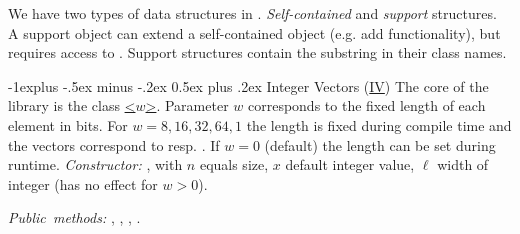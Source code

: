 \documentclass[10pt,landscape]{article}
\makeatletter
\renewcommand{\subsection}{\@startsection{subsection}{2}{0mm}%
                                {-1explus -.5ex minus -.2ex}%
                                {0.5ex plus .2ex}%
                                {\normalfont\normalsize\bfseries}}
\makeatother
\begin{document}
\begin{multicols}{3}
We have two types of data structures in \sdsl.
\emph{Self-contained} and \emph{support}
structures. A support object  can extend
a self-contained object  (e.g. add functionality), but 
requires access to . Support structures contain
the substring  in their class names.

\subsection{Integer Vectors (\href{\sdslgitinc/vectors.hpp}{IV})}
The core of the library is the class 
\href{\sdslgitinc/int_vector.hpp}{\sdslintvector\textless$w$\textgreater}.
Parameter $w$ corresponds to the fixed length of each
element in bits.  For $w=8,16,32,64,1$ the length is
fixed during compile time and the vectors
correspond to \href{http://www.sgi.com/tech/stl/Vector.html}{}
resp. .
If $w=0$ (default) the length can be set during runtime.
\textit{Constructor:} \sdslintvectorZ{}, with 
$n$ equals size, $x$ default integer value, $\ell$ width
of integer (has no effect for $w>0$).

\textit{Public~methods:} , , , 
. 


\end{multicols}
\end{document}
